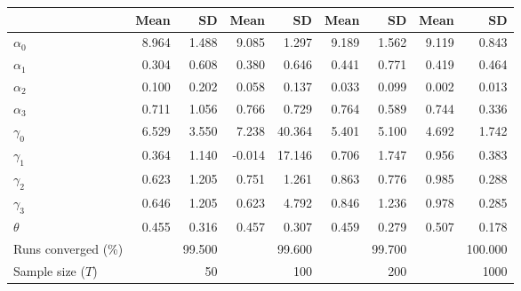 
\begin{tabular}[t]{lrrrrrrrr}
\toprule
  & Mean & SD & Mean  & SD  & Mean   & SD   & Mean    & SD   \\
\midrule
$\alpha_{0}$ & 8.964 & 1.488 & 9.085 & 1.297 & 9.189 & 1.562 & 9.119 & 0.843\\
$\alpha_{1}$ & 0.304 & 0.608 & 0.380 & 0.646 & 0.441 & 0.771 & 0.419 & 0.464\\
$\alpha_{2}$ & 0.100 & 0.202 & 0.058 & 0.137 & 0.033 & 0.099 & 0.002 & 0.013\\
$\alpha_{3}$ & 0.711 & 1.056 & 0.766 & 0.729 & 0.764 & 0.589 & 0.744 & 0.336\\
$\gamma_{0}$ & 6.529 & 3.550 & 7.238 & 40.364 & 5.401 & 5.100 & 4.692 & 1.742\\
$\gamma_{1}$ & 0.364 & 1.140 & -0.014 & 17.146 & 0.706 & 1.747 & 0.956 & 0.383\\
$\gamma_{2}$ & 0.623 & 1.205 & 0.751 & 1.261 & 0.863 & 0.776 & 0.985 & 0.288\\
$\gamma_{3}$ & 0.646 & 1.205 & 0.623 & 4.792 & 0.846 & 1.236 & 0.978 & 0.285\\
$\theta$ & 0.455 & 0.316 & 0.457 & 0.307 & 0.459 & 0.279 & 0.507 & 0.178\\
Runs converged (\%) &  & 99.500 &  & 99.600 &  & 99.700 &  & 100.000\\
Sample size ($T$) &  & 50 &  & 100 &  & 200 &  & 1000\\
\bottomrule
\end{tabular}
